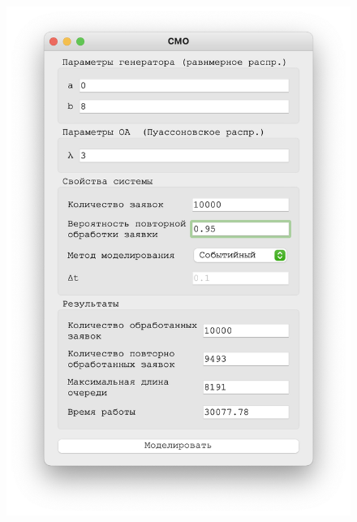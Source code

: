  \begin{figure}[!htb]
    \begin{minipage}{0.55\textwidth}
      \centering
      \includegraphics[width=1\linewidth]{3-95-s}
    \end{minipage}\hfill
    \begin{minipage}{0.55\textwidth}
      \centering

\end{minipage}
\end{figure}
